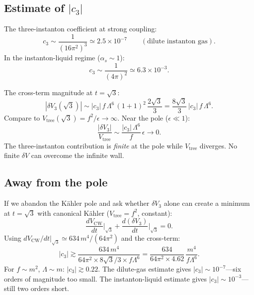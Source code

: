 \subsection{Estimate of $|c_3|$}

The three-instanton coefficient at strong coupling:
\begin{equation}
c_3 \sim \frac{1}{(16\pi^2)^3} \simeq 2.5 \times 10^{-7}
\qquad (\text{dilute instanton gas}).
\end{equation}
In the instanton-liquid regime ($\alpha_s \sim 1$):
\begin{equation}
c_3 \sim \frac{1}{(4\pi)^2} \simeq 6.3 \times 10^{-3}.
\end{equation}

The cross-term magnitude at $t = \sqrt{3}$:
\begin{equation}
|\delta V_3(\sqrt{3})| \sim |c_3|\,f\,\Lambda^6\,(1+1)^2\,\frac{2\sqrt{3}}{3}
= \frac{8\sqrt{3}}{3}\,|c_3|\,f\,\Lambda^6.
\end{equation}
Compare to $V_{\text{tree}}(\sqrt{3}) = f^2/\epsilon \to \infty$.
Near the pole ($\epsilon \ll 1$):
\begin{equation}
\frac{|\delta V_3|}{V_{\text{tree}}} \sim
\frac{|c_3|\,\Lambda^6}{f}\,\epsilon \to 0.
\end{equation}
The three-instanton contribution is \emph{finite} at the pole while $V_{\text{tree}}$ diverges.
No finite $\delta V$ can overcome the infinite wall.

\subsection{Away from the pole}

If we abandon the K\"ahler pole and ask whether $\delta V_3$ alone can
create a minimum at $t = \sqrt{3}$ with canonical K\"ahler ($V_{\text{tree}} = f^2$, constant):
\begin{equation}
\frac{dV_{\text{CW}}}{dt}\bigg|_{\sqrt{3}} + \frac{d(\delta V_3)}{dt}\bigg|_{\sqrt{3}} = 0.
\end{equation}
Using $dV_{\text{CW}}/dt|_{\sqrt{3}} \simeq 634\,m^4/(64\pi^2)$ and the cross-term:
\begin{equation}
|c_3| \gtrsim \frac{634\,m^4}{64\pi^2 \times 8\sqrt{3}/3 \times f\Lambda^6}
= \frac{634}{64\pi^2 \times 4.62}\,\frac{m^4}{f\Lambda^6}.
\end{equation}
For $f \sim m^2$, $\Lambda \sim m$: $|c_3| \gtrsim 0.22$.
The dilute-gas estimate gives $|c_3| \sim 10^{-7}$---six orders of magnitude too small.
The instanton-liquid estimate gives $|c_3| \sim 10^{-3}$---still two orders short.

